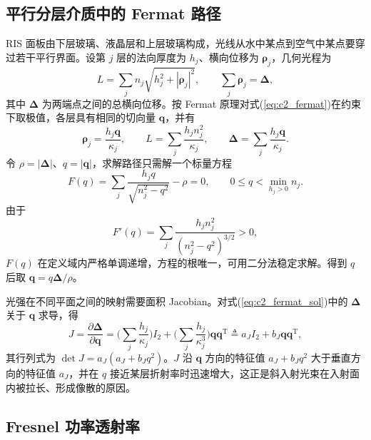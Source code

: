\subsection{平行分层介质中的 Fermat 路径}

RIS 面板由下层玻璃、液晶层和上层玻璃构成，光线从水中某点到空气中某点要穿过若干平行界面。设第 $j$ 层的法向厚度为 $h_j$、横向位移为 $\boldsymbol\rho_j$，几何光程为
\begin{equation}
L=\sum_jn_j\sqrt{h_j^2+|\boldsymbol\rho_j|^2},\qquad \sum_j\boldsymbol\rho_j=\boldsymbol\Delta,
\label{eq:c2_fermat}
\end{equation}
其中 $\boldsymbol\Delta$ 为两端点之间的总横向位移。按 Fermat 原理对式(\ref{eq:c2_fermat})在约束下取极值，各层具有相同的切向量 $\mathbf q$，并有
\begin{equation}
\boldsymbol\rho_j=\frac{h_j\mathbf q}{\kappa_j},\qquad
L=\sum_j\frac{h_jn_j^2}{\kappa_j},\qquad
\boldsymbol\Delta=\sum_j\frac{h_j\mathbf q}{\kappa_j}.
\label{eq:c2_fermat_sol}
\end{equation}
令 $\rho=|\boldsymbol\Delta|$、$q=|\mathbf q|$，求解路径只需解一个标量方程
\begin{equation}
F(q)=\sum_j\frac{h_jq}{\sqrt{n_j^2-q^2}}-\rho=0,\qquad 0\le q<\min_{h_j>0}n_j.
\label{eq:c2_fq}
\end{equation}
由于
\begin{equation}
F'(q)=\sum_j\frac{h_jn_j^2}{(n_j^2-q^2)^{3/2}}>0,
\label{eq:c2_fq_der}
\end{equation}
$F(q)$ 在定义域内严格单调递增，方程的根唯一，可用二分法稳定求解。得到 $q$ 后取 $\mathbf q=q\boldsymbol\Delta/\rho$。

光强在不同平面之间的映射需要面积 Jacobian。对式(\ref{eq:c2_fermat_sol})中的 $\boldsymbol\Delta$ 关于 $\mathbf q$ 求导，得
\begin{equation}
J=\frac{\partial\boldsymbol\Delta}{\partial\mathbf q}
=\Big(\sum_j\frac{h_j}{\kappa_j}\Big)I_2+\Big(\sum_j\frac{h_j}{\kappa_j^3}\Big)\mathbf q\mathbf q^{\mathrm T}
\triangleq a_JI_2+b_J\mathbf q\mathbf q^{\mathrm T},
\label{eq:c2_jacobian}
\end{equation}
其行列式为 $\det J=a_J(a_J+b_Jq^2)$。$J$ 沿 $\mathbf q$ 方向的特征值 $a_J+b_Jq^2$ 大于垂直方向的特征值 $a_J$，并在 $q$ 接近某层折射率时迅速增大，这正是斜入射光束在入射面内被拉长、形成像散的原因。

\subsection{Fresnel 功率透射率}

